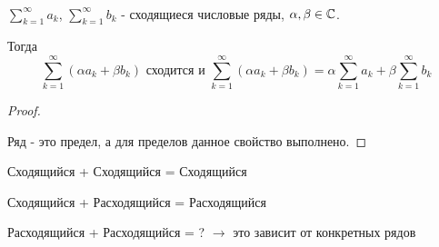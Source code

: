 \documentclass[../main.tex]{subfiles}
\begin{document}
\begin{thm}
    
    ~

    \( \sum\limits_{ k=1}^{ \infty } a_k\), \( \sum\limits_{ k=1}^{ \infty } b_k\) - сходящиеся числовые ряды, \( \alpha , \beta \in \mathbb{C}\).

    Тогда
    \[ \sum\limits_{ k=1}^{ \infty } \left( \alpha a_k+ \beta b_k\right) \text{ сходится и } \sum\limits_{ k=1}^{ \infty } \left( \alpha a_k+ \beta b_k\right)= \alpha  \sum\limits_{ k=1}^{ \infty }a_k + \beta \sum\limits_{ k=1}^{ \infty } b_k\]
\end{thm}
\begin{proof}
    
    ~

    Ряд - это предел, а для пределов данное свойство выполнено.
\end{proof}

\begin{note}
    Сходящийся + Сходящийся = Сходящийся

    Сходящийся + Расходящийся = Расходящийся 
    
    Расходящийся + Расходящийся = ? \( \longrightarrow \) это зависит от конкретных рядов
\end{note}
\end{document}
